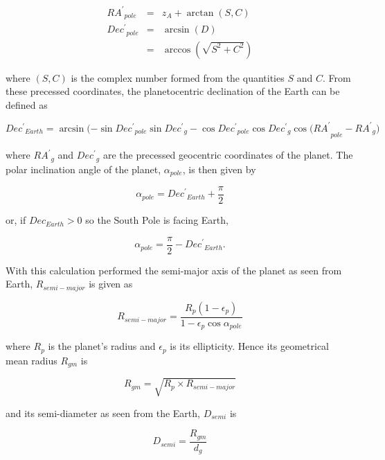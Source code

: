 \documentclass[11pt,twoside]{article}
\renewcommand{\_}{\texttt{\symbol{95}}}
\begin{document}
\begin{eqnarray*}
{RA^\prime}_{pole} & = & z_A + \arctan(S,C)\\
{Dec^\prime}_{pole} & = & \arcsin (D)\\
& = & \arccos (\sqrt{ S^2 + C^2})
\end{eqnarray*}

where $(S,C)$ is the complex number formed from the quantities $S$ and $C$.  From these precessed coordinates, the planetocentric declination of the Earth can be defined as

\begin{displaymath}
{Dec^\prime}_{Earth} = \arcsin {(-\sin {Dec^\prime}_{pole} \sin {Dec^\prime}_g - \cos {Dec^\prime}_{pole} \cos {Dec^\prime}_g \cos (RA^\prime}_{pole} - {RA^\prime}_g)
\end{displaymath}

where ${RA^\prime}_g$ and ${Dec^\prime}_g$ are the precessed geocentric coordinates of the planet.  The polar inclination angle of the planet, $\alpha_{pole}$,  is then given by

\begin{displaymath}
\alpha_{pole} = {Dec^\prime}_{Earth} + \frac{\pi}{2}
\end{displaymath}

or, if $Dec_{Earth} > 0$ so the South Pole is facing Earth,

\begin{displaymath}
\alpha_{pole} =  \frac{\pi}{2} - {Dec^\prime}_{Earth}.
\end{displaymath}

With this calculation performed the semi-major axis of the planet as seen from Earth, $R_{semi-major}$ is given as

\begin{displaymath}
R_{semi-major} = \frac{R_{p} (1 - \epsilon_p)}{1 - \epsilon_p \cos \alpha_{pole}}
\end {displaymath}

where $R_p$ is the planet's radius and $\epsilon_p$ is its ellipticity.  Hence its geometrical mean radius $R_{gm}$ is

\begin{displaymath}
R_{gm} = \sqrt{R_p \times R_{semi-major}}
\end{displaymath}

and its semi-diameter as seen from the Earth, $D_{semi}$ is

\begin{displaymath}
D_{semi} = \frac{R_{gm}}{d_g}
\end{displaymath}
\end{document}
